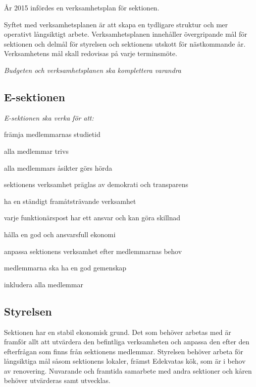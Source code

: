 \documentclass[../_main/handlingar.tex]{subfiles}
\begin{document}

År 2015 infördes en verksamhetsplan för sektionen.

Syftet med verksamhetsplanen är att skapa en tydligare struktur och mer operativt långsiktigt arbete. Verksamhetsplanen innehåller övergripande mål för sektionen och delmål för styrelsen och sektionens utskott för nästkommande år. Verksamhetens mål skall redovisas på varje terminsmöte.

\emph{Budgeten och verksamhetsplanen ska komplettera varandra}

\subsection*{E-sektionen}
\emph{E-sektionen ska verka för att:}
\begin{dashlist}
    \item främja medlemmarnas studietid
    \item alla medlemmar trivs
    \item alla medlemmars åsikter görs hörda
    \item sektionens verksamhet präglas av demokrati och transparens
    \item ha en ständigt framåtsträvande verksamhet
    \item varje funktionärspost har ett ansvar och kan göra skillnad
    \item hålla en god och ansvarsfull ekonomi
    \item anpassa sektionens verksamhet efter medlemmarnas behov
    \item medlemmarna ska ha en god gemenskap
    \item inkludera alla medlemmar
\end{dashlist}

\subsection*{Styrelsen}
Sektionen har en stabil ekonomisk grund. Det som behöver arbetas med är framför allt att utvärdera den befintliga verksamheten och anpassa den efter den efterfrågan som finns från sektionens medlemmar. Styrelsen behöver arbeta för långsiktiga mål såsom sektionens lokaler, främst Edekvatas kök, som är i behov av renovering. Nuvarande och framtida samarbete med andra sektioner och kåren behöver utvärderas samt utvecklas.
\end{document}
